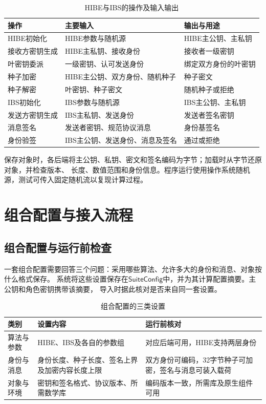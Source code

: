 \begin{table}[H]
\centering\small
\caption{HIBE与IBS的操作及输入输出}
\label{tab:backend-interfaces}
\begin{tabularx}{\textwidth}{@{}p{}p{}X@{}}
\toprule
\rowcolor{black!8} 操作 & 主要输入 & 输出与用途 \\
\midrule
HIBE初始化 & HIBE参数与随机源 & HIBE主公钥、主私钥 \\
接收方密钥生成 & HIBE主私钥、接收身份 & 接收者一级密钥 \\
叶密钥委派 & 一级密钥、认可发送身份 & 绑定双方身份的叶密钥 \\
种子加密 & HIBE主公钥、双方身份、随机种子 & 种子密文 \\
种子解密 & 叶密钥、种子密文 & 随机种子或拒绝 \\
\midrule
IBS初始化 & IBS参数与随机源 & IBS主公钥、主私钥 \\
发送方密钥生成 & IBS主私钥、发送身份 & 发送者签名密钥 \\
消息签名 & 发送者密钥、规范协议消息 & 身份基签名 \\
身份验签 & IBS主公钥、发送身份、消息及签名 & 通过或拒绝 \\
\bottomrule
\end{tabularx}
\end{table}

保存对象时，各后端将主公钥、私钥、密文和签名编码为字节；加载时从字节还原对象，并检查版本、
长度、数值范围和身份信息。程序运行使用操作系统随机源，测试可传入固定随机流以复现计算过程。

\section{组合配置与接入流程}

\subsection{组合配置与运行前检查}
一套组合配置需要回答三个问题：采用哪些算法、允许多大的身份和消息、对象按什么格式保存。
系统将这些设置保存在$\mathsf{SuiteConfig}$中，并为其计算配置摘要。主公钥和角色密钥携带该摘要，
导入时据此核对是否来自同一套设置。

\begin{table}[H]
\centering\small
\caption{组合配置的三类设置}
\label{tab:suite-settings}
\begin{tabularx}{\textwidth}{@{}p{}p{}X@{}}
\toprule
\rowcolor{black!8} 类别 & 设置内容 & 运行前核对 \\
\midrule
算法与参数 & HIBE、IBS及各自的参数组 & 对应后端可用，HIBE支持两层身份 \\
身份与消息 & 身份长度、种子长度、签名上界及加密内容长度上限 & 双方身份可编码，32字节种子可加密，签名与消息可装入载荷 \\
对象与环境 & 密钥和签名格式、协议版本、所需数学库 & 编码版本一致，所需库及原生组件可用 \\
\bottomrule
\end{tabularx}
\end{table}

